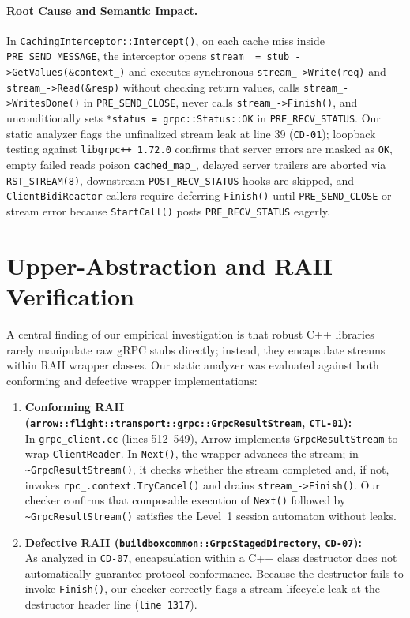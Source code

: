 \documentclass[11pt,a4paper]{article}
\begin{document}
\paragraph{Root Cause and Semantic Impact.}
In \texttt{CachingInterceptor::Intercept()}, on each cache miss inside \texttt{PRE\_SEND\_MESSAGE}, the interceptor opens \texttt{stream\_ = stub\_->GetValues(\&context\_)} and executes synchronous \texttt{stream\_->Write(req)} and \texttt{stream\_->Read(\&resp)} without checking return values, calls \texttt{stream\_->WritesDone()} in \texttt{PRE\_SEND\_CLOSE}, never calls \texttt{stream\_->Finish()}, and unconditionally sets \texttt{*status = grpc::Status::OK} in \texttt{PRE\_RECV\_STATUS}. Our static analyzer flags the unfinalized stream leak at line 39 (\texttt{CD-01}); loopback testing against \texttt{libgrpc++ 1.72.0} confirms that server errors are masked as \texttt{OK}, empty failed reads poison \texttt{cached\_map\_}, delayed server trailers are aborted via \texttt{RST\_STREAM(8)}, downstream \texttt{POST\_RECV\_STATUS} hooks are skipped, and \texttt{ClientBidiReactor} callers require deferring \texttt{Finish()} until \texttt{PRE\_SEND\_CLOSE} or stream error because \texttt{StartCall()} posts \texttt{PRE\_RECV\_STATUS} eagerly.

\section{Upper-Abstraction and RAII Verification}

A central finding of our empirical investigation is that robust C++ libraries rarely manipulate raw gRPC stubs directly; instead, they encapsulate streams within RAII wrapper classes. Our static analyzer was evaluated against both conforming and defective wrapper implementations:

\begin{enumerate}
    \item \textbf{Conforming RAII (\texttt{arrow::flight::transport::grpc::GrpcResultStream}, \texttt{CTL-01}):}\\
    In \texttt{grpc\_client.cc} (lines 512--549), Arrow implements \texttt{GrpcResultStream} to wrap \texttt{ClientReader}. In \texttt{Next()}, the wrapper advances the stream; in \texttt{\~{}GrpcResultStream()}, it checks whether the stream completed and, if not, invokes \texttt{rpc\_.context.TryCancel()} and drains \texttt{stream\_->Finish()}. Our checker confirms that composable execution of \texttt{Next()} followed by \texttt{\~{}GrpcResultStream()} satisfies the Level~1 session automaton without leaks.
    
    \item \textbf{Defective RAII (\texttt{buildboxcommon::GrpcStagedDirectory}, \texttt{CD-07}):}\\
    As analyzed in \texttt{CD-07}, encapsulation within a C++ class destructor does not automatically guarantee protocol conformance. Because the destructor fails to invoke \texttt{Finish()}, our checker correctly flags a stream lifecycle leak at the destructor header line (\texttt{line 1317}).
\end{enumerate}
\end{document}
